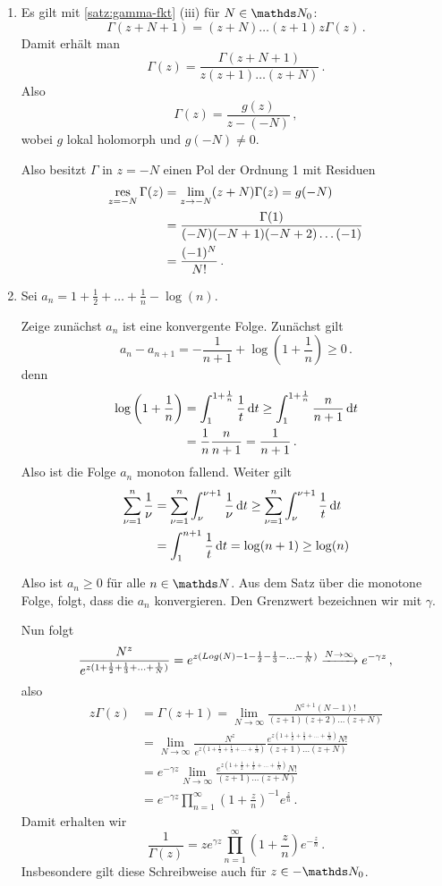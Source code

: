 \begin{bewe}
\begin{enumerate}
\item Es gilt mit \autoref{satz:gamma-fkt} (iii) für $N\in\NN_0$:
\[
	\Gamma(z+N+1)
	= (z+N)\ldots(z+1)z\Gamma(z)
	\,.
\]
Damit erhält man
\[
	\Gamma(z)
	= \frac{\Gamma(z+N+1)}{z(z+1) \ldots (z+N)}
	\,.
\]
Also
\[
	\Gamma(z)
	= \frac{g(z)}{z-(-N)}
	\,,
\]
wobei $g$ lokal holomorph und $g(-N) \not=0$.

Also besitzt $\Gamma$ in $z=-N$ einen Pol der Ordnung 1 mit Residuen
\begin{align*}
	\operatorname*{res}_{z=-N} \Gamma(z)
	&= \lim _{z\to-N} (z+N)\Gamma(z)
	= g(-N) \\
	&= \frac{\Gamma(1)}{(-N)(-N+1)(-N+2)\ldots(-1)} \\
	&= \frac{(-1)^N}{N!}
	\,.
\end{align*}

\item Sei $a_n = 1 + \frac{1}{2} + \ldots + \frac{1}{n} - \log(n)$.

Zeige zunächst $a_n$ ist eine konvergente Folge.
Zunächst gilt
\[
	a_n - a_{n+1}
	= -\frac{1}{n+1} + \log\left(1+\frac{1}{n}\right)
	\geq 0
	\,.
\]
denn 
\begin{align*}
	\log\left(1+\frac{1}{n}\right)
	&= \int_1^{1+\frac{1}{n}} \frac{1}{t} \,\mathrm{d} t
	\geq \int_1^{1+\frac{1}{n}} \frac{n}{n+1} \,\mathrm{d} t \\
	&= \frac{1}{n}\frac{n}{n+1}
	= \frac{1}{n+1}
	\,.
\end{align*}
Also ist die Folge $a_n$ monoton fallend.
Weiter gilt
\begin{align*}
	\sum_{\nu=1}^n \frac{1}{\nu}
	&= \sum_{\nu=1}^n \int_\nu^{\nu+1} \frac{1}{\nu}\,\mathrm{d} t
	\geq \sum_{\nu=1}^n \int_\nu^{\nu+1} \frac{1}{t}\,\mathrm{d} t \\
	&= \int_1^{n+1}\frac{1}{t}\,\mathrm{d} t
	= \log(n+1)
	\geq \log(n)
\end{align*}

Also ist $a_n \geq 0$ für alle $n\in\NN$.
Aus dem Satz über die monotone Folge, folgt, dass die $a_n$ konvergieren.
Den Grenzwert bezeichnen wir mit $\gamma$.

Nun folgt
\[
	\frac{N^z}{e^{z(1+\frac{1}{2} + \frac{1}{3} + \ldots + \frac{1}{N})}}
	= e^{z(Log(N)- 1 - \frac{1}{2} - \frac{1}{3} - \ldots - \frac{1}{N})}
	\xrightarrow{N\to\infty} e^{-\gamma z}
	\,,
\]
also
\begin{align*}
	z\Gamma(z)
	&= \Gamma(z+1) 
	= \lim_{N\to\infty} \frac{N^{z+1} (N-1)!}{(z+1)(z+2)\ldots(z+N)} \\
	&= \lim_{N\to\infty} \frac{N^z}{e^{z(1+\frac{1}{2} + \frac{1}{3} + \ldots + \frac{1}{N})}} \frac{e^{z(1+\frac{1}{2} + \frac{1}{3} + \ldots + \frac{1}{N})}N!}{(z+1)\ldots(z+N)} \\
	&= e^{-\gamma z} \lim_{N\to\infty} \frac{e^{z(1+\frac{1}{2} + \frac{1}{3} + \ldots + \frac{1}{N})}N!}{(z+1)\ldots(z+N)} \\
	&= e^{-\gamma z} \prod_{n=1}^\infty \left(1+\frac{z}{n}\right)^{-1}e^{\frac{z}{n}}
	\,.
\end{align*}
Damit erhalten wir
\[
	\frac{1}{\Gamma(z)}
	= ze^{\gamma z} \prod_{n=1}^\infty \left(1+\frac{z}{n}\right)e^{-\frac{z}{n}}
	\,.
\]
Insbesondere gilt diese Schreibweise auch für $z\in-\NN_0$.


\end{enumerate}
\end{bewe}
